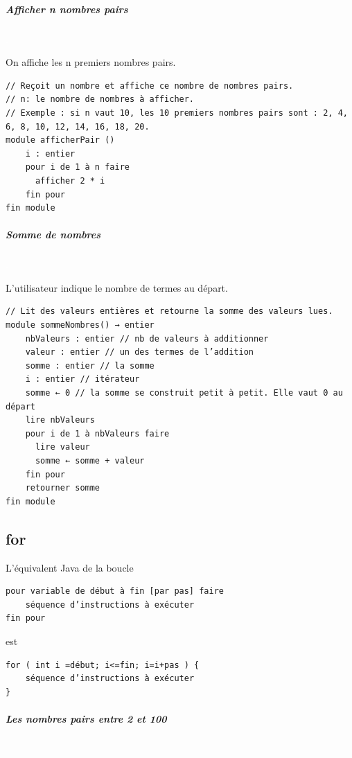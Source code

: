 \documentclass[11pt,a4paper]{article}
\begin{document}
		\subparagraph{Afficher n nombres pairs} 
		
					\textcolor{white}{.} \par
				On affiche les n premiers nombres pairs.
            \par
        \begin{verbatim}
// Reçoit un nombre et affiche ce nombre de nombres pairs.
// n: le nombre de nombres à afficher.
// Exemple : si n vaut 10, les 10 premiers nombres pairs sont : 2, 4, 6, 8, 10, 12, 14, 16, 18, 20.
module afficherPair ()
    i : entier
    pour i de 1 à n faire
      afficher 2 * i
    fin pour
fin module
    \end{verbatim}
			
		\subparagraph{Somme de nombres} 
		
					\textcolor{white}{.} \par
				L'utilisateur indique le nombre de termes au d\'epart.
            \par
        \begin{verbatim}
// Lit des valeurs entières et retourne la somme des valeurs lues.
module sommeNombres() → entier
    nbValeurs : entier // nb de valeurs à additionner
    valeur : entier // un des termes de l’addition
    somme : entier // la somme
    i : entier // itérateur
    somme ← 0 // la somme se construit petit à petit. Elle vaut 0 au départ
    lire nbValeurs
    pour i de 1 à nbValeurs faire
      lire valeur
      somme ← somme + valeur
    fin pour
    retourner somme
fin module
    \end{verbatim}\subsection{for}
		    L'\'equivalent Java de la boucle 
		  
            \par
        \begin{verbatim}
pour variable de début à fin [par pas] faire
    séquence d’instructions à exécuter
fin pour
      \end{verbatim}est 
            \par
        \begin{verbatim}
for ( int i =début; i<=fin; i=i+pas ) {
    séquence d’instructions à exécuter
}
  \end{verbatim}
			
		\subparagraph{Les nombres pairs entre 2 et 100} 
		
					\textcolor{white}{.} \par
				
\end{document}
